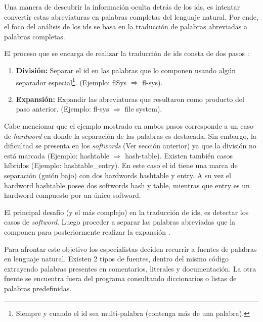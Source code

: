 Una manera de descubrir la información oculta detrás de los ids, es intentar convertir estas abreviaturas en palabras completas del lenguaje natural. Por ende, el foco del análisis de los ids se basa en la traducción de palabras abreviadas a palabras completas.

El proceso que se encarga de realizar la traducción de ids consta de dos pasos \cite{LFBEX07}:

\begin{enumerate}
\itemsep0em%
\item \textbf{División:} Separar el id en las palabras que lo componen usando algún separador especial\footnote[1]{Siempre y cuando el id sea multi-palabra (contenga más de una palabra).}. (Ejemplo: \textsf{flSys} $\Rightarrow$ \textsf{fl-sys}).

\item \textbf{Expansión:} Expandir las abreviaturas que resultaron como producto del paso anterior. (Ejemplo: \textsf{fl-sys} $\Rightarrow$ \textsf{file system}).
\end{enumerate}

Cabe mencionar que el ejemplo mostrado en ambos pasos corresponde a un caso de \textit{hardword} en donde la separación de las palabras es destacada. Sin embargo, la dificultad se presenta en los \textit{softwords} (Ver sección anterior) ya que la división no está marcada (Ejemplo: \textsf{hashtable} $\Rightarrow$ \textsf{hash-table}). Existen también casos híbridos (Ejemplo: \textsf{hashtable\_entry}). En este caso el id tiene una marca de separación (guión bajo) con dos hardwords \textsf{hashtable} y \textsf{entry}. A su vez el hardword \textsf{hashtable} posee dos softwords \textsf{hash} y \textsf{table}, mientras que \textsf{entry} es un hardword compuesto por un único softword.

\begin{framed}
\noindent El principal desafío (y el más complejo) en la traducción de ids, es detectar los casos de \textit{softword}. Luego proceder a separar las palabras abreviadas que la componen para posteriormente realizar la expansión \cite{FBL06,LFBEX07}.  
\end{framed}

Para afrontar este objetivo los especialistas deciden recurrir a fuentes de palabras en lenguaje natural. Existen 2 tipos de fuentes, dentro del mismo código extrayendo palabras presentes en comentarios, literales y documentación. La otra fuente se encuentra fuera del programa consultando diccionarios o listas de palabras predefinidas. 

